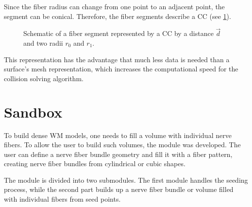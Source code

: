%
Since the fiber radius can change from one point to an adjacent point, the segment can be conical.
Therefore, the fiber segments describe a \ac{CC} (see \cref{fig:conical}).
\par
%
\begin{figure}[!t]
    \centering
    \setlength{\tikzwidth}{0.5\textwidth}
	\caption{Schematic of a fiber segment represented by a  \ac{CC} by a distance $\vec{d}$ and two radii $r_0$ and $r_1$.}
	\label{fig:conical}
\end{figure}
%
This representation has the advantage that much less data is needed than a surface's mesh representation, which increases the computational speed for the collision solving algorithm.
%
% 
% 
\section{Sandbox}\label{sec:sandbox}
%
To build dense \ac{WM} models, one needs to fill a volume with individual nerve fibers.
To allow the user to build such volumes, the module  was developed.
The user can define a nerve fiber bundle geometry and fill it with a fiber pattern, creating nerve fiber bundles from cylindrical or cubic shapes.
\par
%
The module  is divided into two submodules.
The first module handles the seeding process, while the second part builds up a nerve fiber bundle or volume filled with individual fibers from seed points.
%
% 
% 
